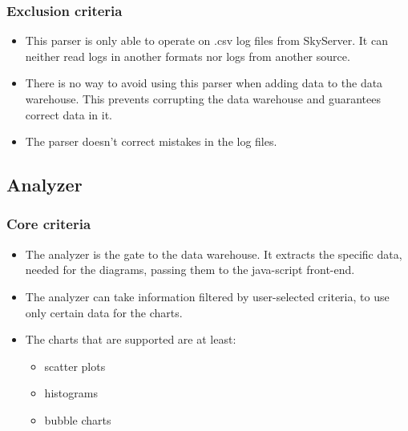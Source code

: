  
\subsubsection{Exclusion criteria}
\begin{itemize}
\item This \gls{parser} is only able to operate on \gls{.csv} \glspl{log file} from \gls{SkyServer}. 
It can neither read logs in another formats nor logs from another source.

\item There is no way to avoid using this \gls{parser} when adding data to the \gls{data warehouse}. 
This prevents corrupting the \gls{data warehouse} and guarantees correct data in it.

\item The \gls{parser} doesn't correct mistakes in the \glspl{log file}.
\end{itemize}



\subsection{Analyzer}

\subsubsection{Core criteria}
\begin{itemize}
\item The analyzer is the gate to the \gls{data warehouse}. It extracts the specific data, 
needed for the \glspl{diagram}, passing them to the java-script front-end.
\item The analyzer can take information filtered by user-selected criteria, 
to use only certain data for the \glspl{chart}.
\item The \glspl{chart} that are supported are at least:
\begin{itemize}
\item \glspl{scatter plot}
\item \glspl{histogram}
\item \glspl{bubble chart}
\end{itemize}

\end{itemize}

